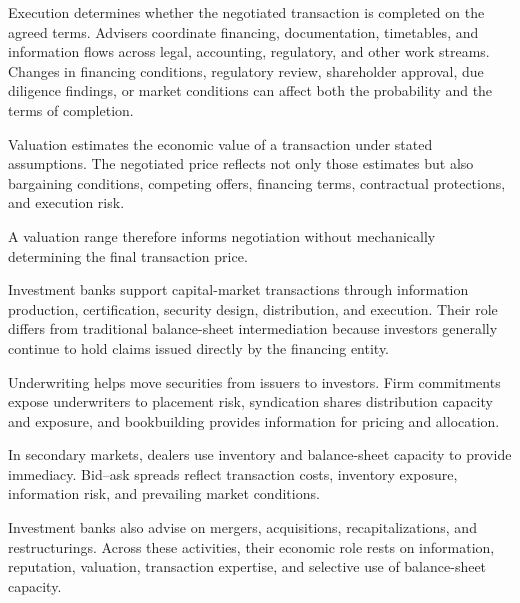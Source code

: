 Execution determines whether the negotiated transaction is completed on the agreed terms. Advisers coordinate financing, documentation, timetables, and information flows across legal, accounting, regulatory, and other work streams. Changes in financing conditions, regulatory review, shareholder approval, due diligence findings, or market conditions can affect both the probability and the terms of completion.

\begin{tcolorbox}[
  enhanced,
  breakable,
  colback=white,
  colframe=FinanceBlue,
  boxrule=0.7pt,
  sharp corners,
  borderline west={2.2pt}{0pt}{FinanceBlue},
  title=\textbf{Financial Perspective: Value and Price Are Not the Same},
  coltitle=white,
  colbacktitle=FinanceBlue,
  fonttitle=\bfseries,
  before skip=1.2em,
  after skip=1.2em
]

Valuation estimates the economic value of a transaction under stated assumptions. The negotiated price reflects not only those estimates but also bargaining conditions, competing offers, financing terms, contractual protections, and execution risk.

A valuation range therefore informs negotiation without mechanically determining the final transaction price.

\end{tcolorbox}



Investment banks support capital-market transactions through information production, certification, security design, distribution, and execution. Their role differs from traditional balance-sheet intermediation because investors generally continue to hold claims issued directly by the financing entity.

Underwriting helps move securities from issuers to investors. Firm commitments expose underwriters to placement risk, syndication shares distribution capacity and exposure, and bookbuilding provides information for pricing and allocation.

In secondary markets, dealers use inventory and balance-sheet capacity to provide immediacy. Bid--ask spreads reflect transaction costs, inventory exposure, information risk, and prevailing market conditions.

Investment banks also advise on mergers, acquisitions, recapitalizations, and restructurings. Across these activities, their economic role rests on information, reputation, valuation, transaction expertise, and selective use of balance-sheet capacity.

